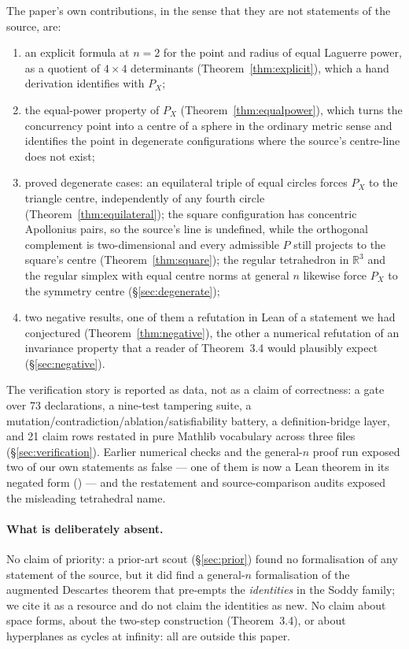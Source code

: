 \documentclass[11pt]{article}
\theoremstyle{definition}
\theoremstyle{remark}
\newcommand{\RR}{\mathbb{R}}
\begin{document}
The paper's own contributions, in the sense that they are not statements of the source, are:
\begin{enumerate}
\item an explicit formula at $n=2$ for the point and radius of equal Laguerre power, as a quotient of
$4\times4$ determinants (Theorem~\ref{thm:explicit}), which a hand derivation identifies with
$P_X$;
\item the equal-power property of $P_X$ (Theorem~\ref{thm:equalpower}), which turns the
concurrency point into a centre of a sphere in the ordinary metric sense and identifies the point in
degenerate configurations where the source's centre-line does not exist;
\item proved degenerate cases: an equilateral triple of equal circles forces $P_X$ to the triangle
centre, independently of any fourth circle (Theorem~\ref{thm:equilateral}); the square configuration has
concentric Apollonius pairs, so the source's line is undefined, while the orthogonal complement is
two-dimensional and every admissible $P$ still projects to the square's centre
(Theorem~\ref{thm:square}); the regular tetrahedron in $\RR^3$ and the regular simplex with equal
centre norms at general $n$ likewise force $P_X$ to the symmetry centre
(\S\ref{sec:degenerate});
\item two negative results, one of them a refutation in Lean of a statement we had conjectured
(Theorem~\ref{thm:negative}), the other a numerical refutation of an invariance property that a
reader of Theorem~3.4 would plausibly expect (\S\ref{sec:negative}).
\end{enumerate}

The verification story is reported as data, not as a claim of correctness: a gate over 73
declarations, a nine-test tampering suite, a mutation/contradiction/ablation/satisfiability battery,
a definition-bridge layer, and 21 claim rows restated in pure Mathlib vocabulary across three
files (\S\ref{sec:verification}). Earlier numerical checks and the general-$n$ proof run exposed two
of our own statements as false --- one of them is now a Lean theorem in its negated form
() --- and the restatement and source-comparison audits exposed the
misleading tetrahedral name.

\paragraph{What is deliberately absent.} No claim of priority: a prior-art scout
(\S\ref{sec:prior}) found no formalisation of any statement of the source, but it did find a
general-$n$ formalisation of the augmented Descartes theorem that pre-empts the \emph{identities} in
the Soddy family; we cite it as a resource and do not claim the identities as new. No claim about
space forms, about the two-step construction (Theorem~3.4), or about hyperplanes as cycles at
infinity: all are outside this paper.
\end{document}
